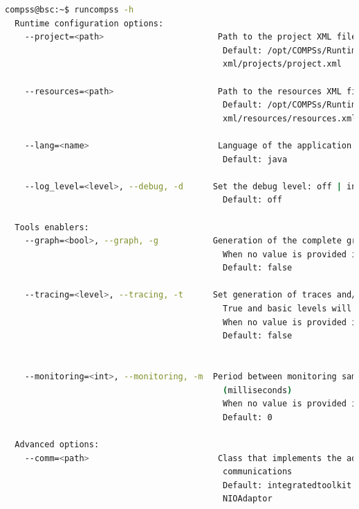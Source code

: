 \begin{lstlisting}[language=bash]
compss@bsc:~$ runcompss -h
  Runtime configuration options:
    --project=<path>                       Path to the project XML file
                                            Default: /opt/COMPSs/Runtime/configuration/
                                            xml/projects/project.xml
                                            
    --resources=<path>                     Path to the resources XML file
                                            Default: /opt/COMPSs/Runtime/configuration/
                                            xml/resources/resources.xml
                                            
    --lang=<name>                          Language of the application (java/c/python)
                                            Default: java
                                            
    --log_level=<level>, --debug, -d      Set the debug level: off | info | debug
                                            Default: off

  Tools enablers:
    --graph=<bool>, --graph, -g           Generation of the complete graph (true/false)
                                            When no value is provided it is set to true
                                            Default: false
                                            
    --tracing=<level>, --tracing, -t      Set generation of traces and/or tracing level ( [ true | basic ] | advanced | false)
                                            True and basic levels will produce the same traces.
                                            When no value is provided it is set to true
                                            Default: false

                                            
    --monitoring=<int>, --monitoring, -m  Period between monitoring samples 
                                            (milliseconds)
                                            When no value is provided it is set to 2000
                                            Default: 0

  Advanced options:
    --comm=<path>                          Class that implements the adaptor for 
                                            communications
                                            Default: integratedtoolkit.nio.master.
                                            NIOAdaptor
                                            

\end{lstlisting}
